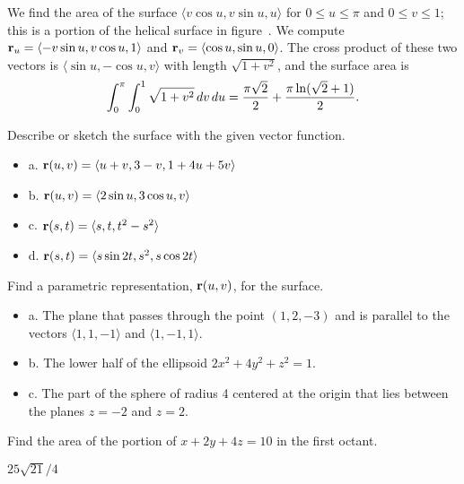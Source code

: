 \begin{example} We find the area of the surface $\langle v\cos u,v\sin
u,u\rangle$ for $0\le u \le \pi$ and  $0\le v\le 1$; this is a portion
of the helical surface in figure~.
We compute ${\bf r}_u = \langle -v\sin u,v\cos u,1\rangle$
and ${\bf r}_v = \langle \cos u,\sin u,0\rangle$.
The cross product of these two vectors is $\langle \sin u,-\cos
u,v\rangle$ with length $\sqrt{1+v^2}$, and the surface area is
$$\int_0^\pi\int_0^1 \sqrt{1+v^2}\,dv\,du={\pi\sqrt2\over2}+
{\pi\ln(\sqrt2+1)\over 2}.$$
\end{example}

\begin{exercises}

\begin{exercise} Describe or sketch the surface with the given vector function.
\begin{itemize} %

  \item{a.} ${\bf r}(u,v) = \langle u+v,3-v,1+4u+5v\rangle$
  \item{b.} ${\bf r}(u,v) = \langle 2\sin u, 3\cos u, v\rangle$ 
  \item{c.} ${\bf r}(s,t) = \langle s,t,t^2-s^2\rangle$
  \item{d.} ${\bf r}(s,t) = \langle s\sin 2t, s^2, s\cos 2t\rangle$

\end{itemize}

\begin{exercise} Find a parametric representation, ${\bf r}(u,v)$, for the surface.
\begin{itemize} %
  \item{a.} The plane that passes through the point $(1,2,-3)$ and is parallel
  to the vectors $\langle 1,1,-1\rangle$ and $\langle 1,-1,1\rangle$.

  \item{b.} The lower half of the ellipsoid $2x^2+4y^2+z^2=1$.

  \item{c.} The part of the sphere of radius 4 centered at the origin that lies
  between the planes $z=-2$ and $z=2$.
\end{itemize}

\begin{exercise} Find the area of the portion of $x+2y+4z=10$ in the first
octant.
\begin{answer} $25\sqrt{21}/4$
\end{answer}\end{exercise}


\end{exercise}
\end{exercise}
\end{exercises}
